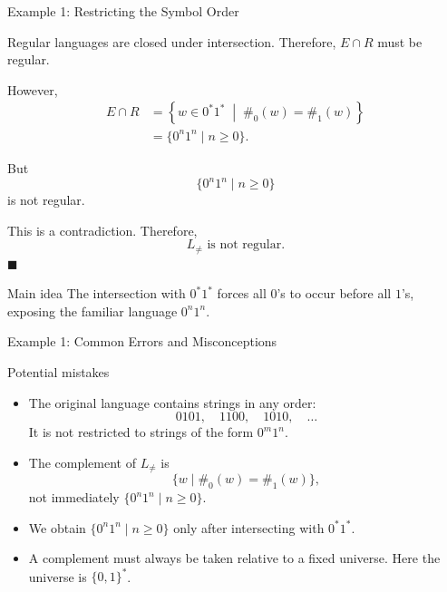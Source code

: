 \documentclass[10pt,aspectratio=169]{beamer}
\begin{document}
\begin{frame}{Example 1: Restricting the Symbol Order}

\small
Regular languages are closed under intersection. Therefore,
\(E\cap R\) must be regular.

However,
\[
\begin{aligned}
E\cap R
&=
\left\{
w\in 0^*1^*
\;\middle|\;
\#_0(w)=\#_1(w)
\right\} \\[0.3em]
&=
\{0^n1^n\mid n\geq 0\}.
\end{aligned}
\]

But
\[
\{0^n1^n\mid n\geq 0\}
\]
is not regular.

\vspace{0.5em}
This is a contradiction. Therefore,
\[
\boxed{L_{\neq}\text{ is not regular}.}
\]
\hfill\(\blacksquare\)

\vspace{0.5em}
\begin{block}{Main idea}
The intersection with \(0^*1^*\) forces all \(0\)'s to occur before
all \(1\)'s, exposing the familiar language \(0^n1^n\).
\end{block}

\end{frame}

\begin{frame}{Example 1: Common Errors and Misconceptions}

\small
\begin{alertblock}{Potential mistakes}
\begin{itemize}
    \item The original language contains strings in any order:
    \[
    0101,\quad 1100,\quad 1010,\quad \ldots
    \]
    It is not restricted to strings of the form \(0^m1^n\).

    \item The complement of \(L_{\neq}\) is
    \[
    \{w\mid \#_0(w)=\#_1(w)\},
    \]
    not immediately \(\{0^n1^n\mid n\geq 0\}\).

    \item We obtain \(\{0^n1^n\mid n\geq 0\}\) only after intersecting
    with \(0^*1^*\).

    \item A complement must always be taken relative to a fixed
    universe. Here the universe is \(\{0,1\}^*\).
\end{itemize}
\end{alertblock}

\end{frame}
\end{document}
